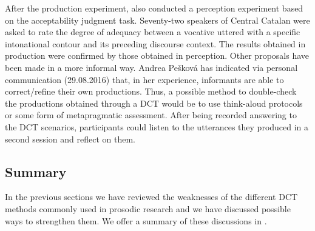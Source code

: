 \documentclass[output=paper]{LSP/langsci}
\begin{document}
After the production experiment, \citet{Borras-Comes2015} also conducted a perception experiment based on the acceptability judgment task. Seventy-two speakers of Central Catalan were asked to rate the degree of adequacy between a vocative uttered with a specific intonational contour and its preceding discourse context. The results obtained in production were confirmed by those obtained in perception. Other proposals have been made in a more informal way. Andrea Pešková has indicated via personal communication (29.08.2016) that, in her experience, informants are able to correct/refine their own productions. Thus, a possible method to double-check the productions obtained through a DCT would be to use think-aloud protocols or some form of metapragmatic assessment. After being recorded answering to the DCT scenarios, par\-ti\-ci\-pants could listen to the utterances they produced in a second session and reflect on them.


\subsection{Summary}
\label{sec:van:4}

In the previous sections we have reviewed the weaknesses of the different DCT methods commonly used in prosodic research and we have discussed possible ways to strengthen them.  We offer a summary of these discussions in .
\end{document}

